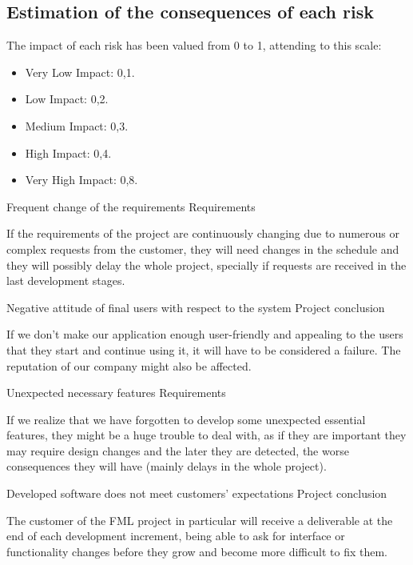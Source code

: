 \subsection{Estimation of the consequences of each risk}

The impact of each risk has been valued from 0 to 1, attending to this scale:
\begin{itemize}
\item Very Low Impact: 0,1.
\item Low Impact: 0,2.
\item Medium Impact: 0,3.
\item High Impact: 0,4.
\item Very High Impact: 0,8.
\end{itemize}

\begin{risk}[riskReqChange]{Frequent change of the requirements}
\riskcat Requirements

If the requirements of the project are continuously changing due to numerous or complex requests from the customer, they will need changes in the schedule and they will possibly delay the whole project, specially if requests are received in the last development stages.
\end{risk}

\begin{risk}[riskAttitude]{Negative attitude of final users with respect to the system}
\riskcat Project conclusion

If we don't make our application enough user-friendly and appealing to the users that they start and continue using it, it will have to be considered a failure. The reputation of our company might also be affected.
\end{risk}

\begin{risk}[riskFeaturesUnexpected]{Unexpected necessary features}
\riskcat Requirements

If we realize that we have forgotten to develop some unexpected essential features, they might be a huge trouble to deal with, as if they are important they may require design changes and the later they are detected, the worse consequences they will have (mainly delays in the whole project).
\end{risk}

\begin{risk}[riskExpectations]{Developed software does not meet customers' expectations}
\riskcat Project conclusion

The customer of the FML project in particular will receive a deliverable at the end of each development increment, being able to ask for interface or functionality changes before they grow and become more difficult to fix them.
\end{risk}

